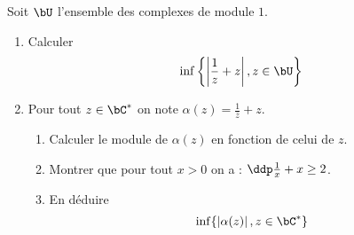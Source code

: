 




\begin{exercice}
Soit $\bU$ l'ensemble des complexes de module $1$. 
\begin{enumerate}
\item Calculer 
$$\inf \left\{ \left| \frac{1}{z}+z\right| , z \in \bU\right\}$$

\item Pour tout $z\in \bC^*$ on note  $\alpha(z)= \frac{1}{\bar{z}}+z$. 
\begin{enumerate}
\item Calculer le module de $\alpha(z)$ en fonction de celui de $z$. 
\item Montrer que pour tout $x>0$ on a : $\ddp \frac{1}{x}+x\geq 2$.
\item En déduire 
$$\inf\{ \left| \alpha(z)\right| , z \in \bC^*\}$$
\end{enumerate}
\end{enumerate}
\end{exercice}


